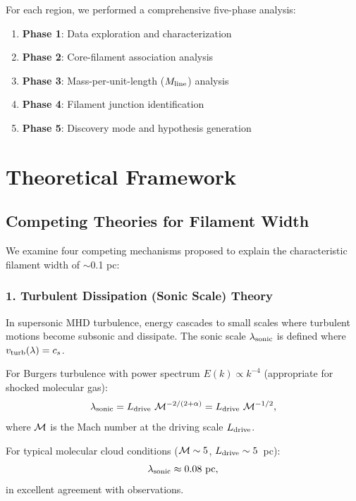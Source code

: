 \documentclass[11pt,a4paper]{article}
\begin{document}
For each region, we performed a comprehensive five-phase analysis:
\begin{enumerate}
    \item \textbf{Phase 1}: Data exploration and characterization
    \item \textbf{Phase 2}: Core-filament association analysis
    \item \textbf{Phase 3}: Mass-per-unit-length ($M_{\rm line}$) analysis
    \item \textbf{Phase 4}: Filament junction identification
    \item \textbf{Phase 5}: Discovery mode and hypothesis generation
\end{enumerate}

\section{Theoretical Framework}

\subsection{Competing Theories for Filament Width}

We examine four competing mechanisms proposed to explain the characteristic filament width of $\sim$0.1 pc:

\subsubsection{1. Turbulent Dissipation (Sonic Scale) Theory}

In supersonic MHD turbulence, energy cascades to small scales where turbulent motions become subsonic and dissipate. The sonic scale $\lambda_{\rm sonic}$ is defined where $v_{\rm turb}(\lambda) = c_s$.

For Burgers turbulence with power spectrum $E(k) \propto k^{-4}$ (appropriate for shocked molecular gas):
\begin{equation}
\lambda_{\rm sonic} = L_{\rm drive}~{\cal M}^{-2/(2+\alpha)} = L_{\rm drive}~{\cal M}^{-1/2},
\end{equation}
where ${\cal M}$ is the Mach number at the driving scale $L_{\rm drive}$.

For typical molecular cloud conditions (${\cal M} \sim 5$, $L_{\rm drive} \sim 5$~pc):
\begin{equation}
\lambda_{\rm sonic} \approx 0.08~{\rm pc},
\end{equation}
in excellent agreement with observations.
\end{document}
